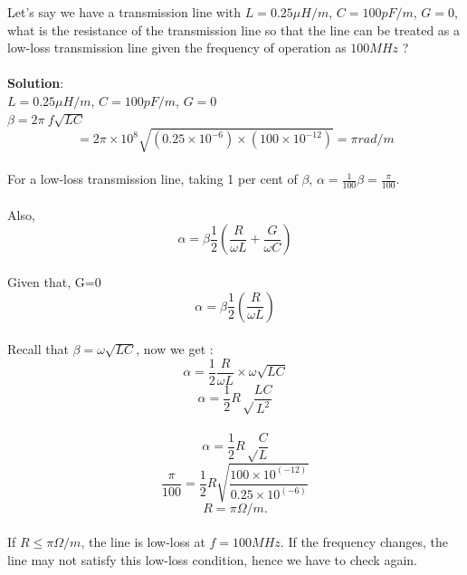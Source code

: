\begin{exmp}
Let's say we have a transmission line with $L = 0.25\mu H/m$, ${C= 100pF/m}$, $G = 0$, what is the resistance of the transmission line so that the line can be treated as a low-loss transmission line given the frequency of operation as $100MHz$ ?\\\\
\textbf{Solution}:\\
$L= 0.25\mu H/m$, $C= 100pF/m$, $G = 0$\\
$\beta = 2\pi \ f {\sqrt{LC}}$
\begin{equation*}
=2 \pi \times 10^8 \sqrt{(0.25 \times 10^{-6}) \times (100 \times 10^{-12})}  = \pi rad/m
\end{equation*}\\
 For a low-loss transmission line, taking 1 per cent of $\beta$,
$ \alpha= \frac{1}{100} \beta = \frac{\pi}{100}$.\\\\
Also,
\begin{equation*}
\alpha = \beta\frac{1}{2} ( \frac{R}{\omega L} + \frac{G}{\omega C})
\end{equation*}\\
Given that, G=0\\
\begin{equation*}
\alpha = \beta\frac{1}{2} ( \frac{R}{\omega L} )
\end{equation*}\\
Recall that $\beta = \omega\sqrt{LC} $, now we get :
\begin{equation*}
\alpha = \frac{1}{2}\frac{R}{\omega L} \times \omega\sqrt{LC} 
\end{equation*}
\begin{equation*}
\alpha = \frac{1}{2} R \sqrt \frac{LC}{L^{2}} 
\end{equation*}\\
\begin{equation*}
\alpha = \frac{1}{2} R \sqrt \frac{C}{L}
\end{equation*}
\begin{equation*}
\frac{\pi}{100} = \frac{1}{2} R \sqrt{\frac{100 \times 10^{(-12)}}{0.25 \times 10^{(-6)}}}
\end{equation*}
\begin{equation*}
 R=\pi\Omega/m.
\end{equation*}\\
 If $R \leq \pi\Omega/m$, the line is low-loss at $ f= 100MHz$. If the frequency changes, the line may not satisfy this low-loss condition, hence we have to check again.
\end{exmp}

